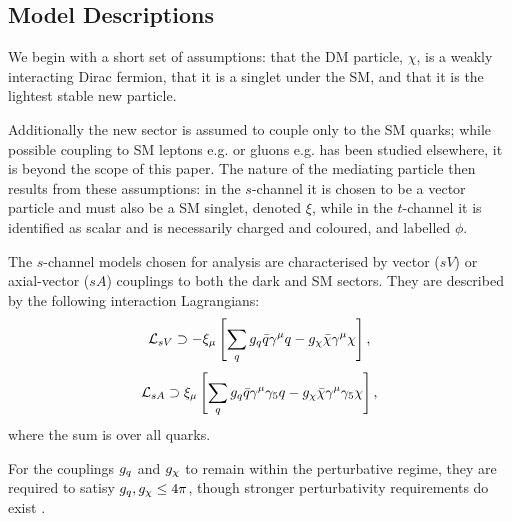 \subsection{Model Descriptions}
We begin with a short set of assumptions: that the DM particle, $\chi$, is a weakly interacting Dirac fermion, that it is a singlet under the SM, and that it is the lightest stable new particle.

Additionally the new sector is assumed to couple only to the SM quarks; while possible coupling to SM leptons e.g. \cite{1103.0240} or gluons e.g. \cite{1506.01408} has been studied elsewhere, it is beyond the scope of this paper. The nature of the mediating particle then results from these assumptions: in the $s$-channel it is chosen to be a vector particle and must also be a SM singlet, denoted $\xi$, while in the $t$-channel it is identified as scalar and is necessarily charged and coloured, and labelled $\phi$.

The $s$-channel models chosen for analysis are characterised by vector ($sV$) or axial-vector ($sA$) couplings to both the dark and SM sectors. They are described by the following interaction Lagrangians:
\begin{equation}
\label{L_int_sV}
\mathcal{L}_{sV} \supset - \xi_{\mu}\left[ \sum\limits_{q} g_q\bar{q}\gamma^{\mu}q - g_{\chi}\bar{\chi}\gamma^{\mu}\chi\right],
\end{equation}
\begin{equation}
\label{L_int_sA}
\mathcal{L}_{sA} \supset  \xi_{\mu}\left[\sum\limits_{q} g_q\bar{q}\gamma^{\mu}\gamma_{5}q - g_{\chi}\bar{\chi}\gamma^{\mu}\gamma_{5}\chi\right],
\end{equation}
where the sum is over all quarks.

For the couplings $g_q$ and $g_{\chi}$ to remain within the perturbative regime, they are required to satisy $g_q,g_{\chi} \leq 4\pi$, though stronger perturbativity requirements do exist \cite{ValidEFT}.

